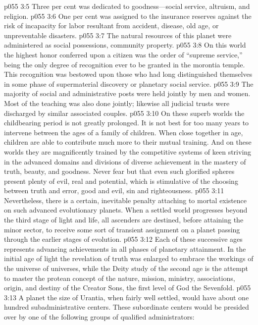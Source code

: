 \pc \vs p055 3:5 \bibnobreakspace Three per cent was dedicated to goodness---social service, altruism, and religion.
\pc \vs p055 3:6 \bibnobreakspace One per cent was assigned to the insurance reserves against the risk of incapacity for labor resultant from accident, disease, old age, or unpreventable disasters.
\pc \vs p055 3:7 The natural resources of this planet were administered as social possessions, community property.
\vs p055 3:8 On this world the highest honor conferred upon a citizen was the order of “supreme service,” being the only degree of recognition ever to be granted in the morontia temple. This recognition was bestowed upon those who had long distinguished themselves in some phase of supermaterial discovery or planetary social service.
\vs p055 3:9 The majority of social and administrative posts were held jointly by men and women. Most of the teaching was also done jointly; likewise all judicial trusts were discharged by similar associated couples.
\pc \vs p055 3:10 On these superb worlds the childbearing period is not greatly prolonged. It is not best for too many years to intervene between the ages of a family of children. When close together in age, children are able to contribute much more to their mutual training. And on these worlds they are magnificently trained by the competitive systems of keen striving in the advanced domains and divisions of diverse achievement in the mastery of truth, beauty, and goodness. Never fear but that even such glorified spheres present plenty of evil, real and potential, which is stimulative of the choosing between truth and error, good and evil, sin and righteousness.
\vs p055 3:11 Nevertheless, there is a certain, inevitable penalty attaching to mortal existence on such advanced evolutionary planets. When a settled world progresses beyond the third stage of light and life, all ascenders are destined, before attaining the minor sector, to receive some sort of transient assignment on a planet passing through the earlier stages of evolution.
\vs p055 3:12 Each of these successive ages represents advancing achievements in all phases of planetary attainment. In the initial age of light the revelation of truth was enlarged to embrace the workings of the universe of universes, while the Deity study of the second age is the attempt to master the protean concept of the nature, mission, ministry, associations, origin, and destiny of the Creator Sons, the first level of God the Sevenfold.
\pc \vs p055 3:13 A planet the size of Urantia, when fairly well settled, would have about one hundred subadministrative centers. These subordinate centers would be presided over by one of the following groups of qualified administrators:
